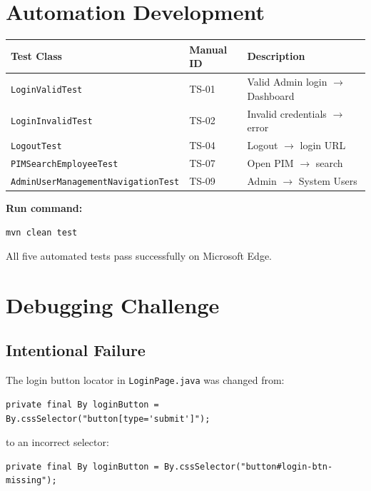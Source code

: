 ﻿\documentclass[11pt,a4paper]{article}
\begin{document}
\section{Automation Development}

\begin{table}[H]
\centering
\begin{tabular}{@{}lll@{}}
\toprule
\textbf{Test Class} & \textbf{Manual ID} & \textbf{Description} \\
\midrule
\texttt{LoginValidTest} & TS-01 & Valid Admin login $\rightarrow$ Dashboard \\
\texttt{LoginInvalidTest} & TS-02 & Invalid credentials $\rightarrow$ error \\
\texttt{LogoutTest} & TS-04 & Logout $\rightarrow$ login URL \\
\texttt{PIMSearchEmployeeTest} & TS-07 & Open PIM $\rightarrow$ search \\
\texttt{AdminUserManagementNavigationTest} & TS-09 & Admin $\rightarrow$ System Users \\
\bottomrule
\end{tabular}
\end{table}

\noindent\textbf{Run command:}
\begin{lstlisting}
mvn clean test
\end{lstlisting}

\noindent All five automated tests pass successfully on Microsoft Edge.

\section{Debugging Challenge}

\subsection{Intentional Failure}
The login button locator in \texttt{LoginPage.java} was changed from:
\begin{lstlisting}
private final By loginButton = By.cssSelector("button[type='submit']");
\end{lstlisting}
to an incorrect selector:
\begin{lstlisting}
private final By loginButton = By.cssSelector("button#login-btn-missing");
\end{lstlisting}
\end{document}
